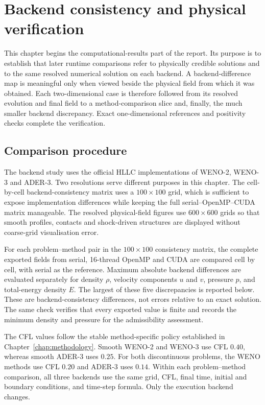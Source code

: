 \chapter{Backend consistency and physical verification}
\label{chap:backend-consistency}

This chapter begins the computational-results part of the report. Its purpose is to establish
that later runtime comparisons refer to physically credible solutions and to the same
resolved numerical solution on each backend. A backend-difference map is meaningful only
when viewed beside the physical field from which it was obtained. Each two-dimensional
case is therefore followed from its resolved evolution and final field to a method-comparison
slice and, finally, the much smaller backend discrepancy. Exact one-dimensional references
and positivity checks complete the verification.

\section{Comparison procedure}

The backend study uses the official HLLC implementations of WENO-2, WENO-3
and ADER-3.  Two resolutions serve different purposes in this chapter.  The
cell-by-cell backend-consistency matrix uses a \(100\times100\) grid, which is
sufficient to expose implementation differences while keeping the full
serial--OpenMP--CUDA matrix manageable.  The resolved physical-field figures
use \(600\times600\) grids so that smooth profiles, contacts and shock-driven
structures are displayed without coarse-grid visualisation error.

For each problem--method pair in the \(100\times100\) consistency matrix, the
complete exported fields from serial, 16-thread OpenMP and CUDA are compared
cell by cell, with serial as the reference.  Maximum absolute backend
differences are evaluated separately for density \(\rho\), velocity components
\(u\) and \(v\), pressure \(p\), and total-energy density \(E\). The largest of
these five discrepancies is reported below.  These are backend-consistency
differences, not errors relative to an exact solution.  The same check verifies
that every exported value is finite and records the minimum density and
pressure for the admissibility assessment.

The CFL values follow the stable method-specific policy established in
Chapter~\ref{chap:methodology}.  Smooth WENO-2 and WENO-3 use CFL \(0.40\),
whereas smooth ADER-3 uses \(0.25\).  For both discontinuous problems, the
WENO methods use CFL \(0.20\) and ADER-3 uses \(0.14\).  Within each
problem--method comparison, all three backends use the same grid, CFL,
final time, initial and boundary conditions, and time-step formula. Only
the execution backend changes.

